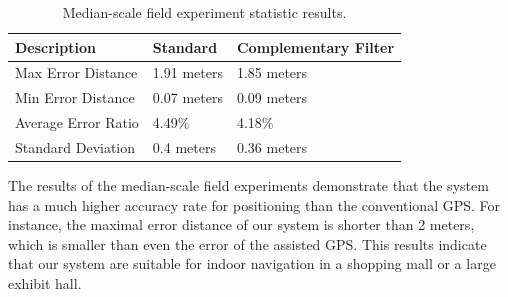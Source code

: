 \begin{table}
\begin{center}
    \begin{tabular}{ | l | l | l |}
    \hline
    Description & Standard & Complementary Filter \\ \hline\hline
    Max Error Distance & 1.91 meters & 1.85 meters \\ \hline
    Min Error Distance & 0.07 meters & 0.09 meters \\ \hline
    Average Error Ratio & 4.49\% & 4.18\% \\ \hline
    Standard Deviation & 0.4 meters & 0.36 meters \\ \hline
    \end{tabular}
\end{center}
\caption{Median-scale field experiment statistic results.}\label{tb-median-scale-analysis}
\end{table}
The results of the median-scale field experiments demonstrate that the system has a much higher accuracy rate for positioning than the conventional GPS. For instance, the maximal error distance of our system is shorter than 2 meters, which is smaller than even the error of the assisted GPS. This results indicate that our system are suitable for indoor navigation in a shopping mall or a large exhibit hall.

